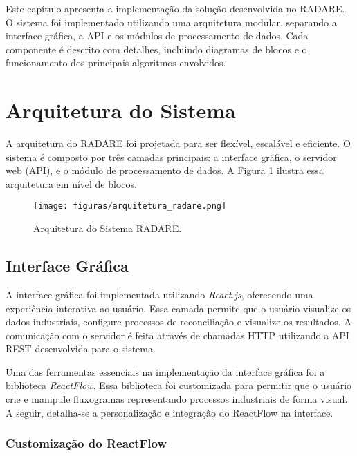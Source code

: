\label{Cap:Implementacao}

Este capítulo apresenta a implementação da solução desenvolvida no RADARE. O sistema foi implementado utilizando uma arquitetura modular, separando a interface gráfica, a API e os módulos de processamento de dados. Cada componente é descrito com detalhes, incluindo diagramas de blocos e o funcionamento dos principais algoritmos envolvidos.

\section{Arquitetura do Sistema}
\label{Sec:ArquiteturaSistema}

A arquitetura do RADARE foi projetada para ser flexível, escalável e eficiente. O sistema é composto por três camadas principais: a interface gráfica, o servidor web (API), e o módulo de processamento de dados. A Figura \ref{Fig:Arquitetura} ilustra essa arquitetura em nível de blocos.

\begin{figure}[htbp]
    \centering
    \texttt{[image: figuras/arquitetura\_radare.png]}
    \caption{Arquitetura do Sistema RADARE.}
    \label{Fig:Arquitetura}
\end{figure}

\subsection{Interface Gráfica}
\label{Sec:InterfaceGrafica}

A interface gráfica foi implementada utilizando \textit{React.js}, oferecendo uma experiência interativa ao usuário. Essa camada permite que o usuário visualize os dados industriais, configure processos de reconciliação e visualize os resultados. A comunicação com o servidor é feita através de chamadas HTTP utilizando a API REST desenvolvida para o sistema.

Uma das ferramentas essenciais na implementação da interface gráfica foi a biblioteca \textit{ReactFlow}. Essa biblioteca foi customizada para permitir que o usuário crie e manipule fluxogramas representando processos industriais de forma visual. A seguir, detalha-se a personalização e integração do ReactFlow na interface.

\subsubsection{Customização do ReactFlow}

